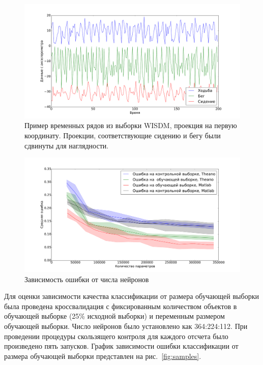 \documentclass[12pt]{article}
\begin{document}
\begin{figure}[tb!]
 \centering
  \includegraphics[width=1.0\textwidth]{wisdm.pdf}
 \caption{Пример временных рядов из выборки WISDM, проекция на первую координату. Проекции, соответствующие сидению и бегу были сдвинуты для наглядности.}
 \label{fig:wisdm}
\end{figure}


\begin{figure}[tb!]
 \centering
  \includegraphics[width=1.0\textwidth]{neurons.pdf}
 \caption{Зависимость ошибки от числа нейронов}
 \label{fig:neurons}
\end{figure}


Для оценки зависимости качества классификации от размера обучающей выборки была проведена кроссвалидация с фиксированным количеством объектов в обучающей выборке (25\% исходной выборки) и переменным размером обучающей выборки. Число нейронов было установлено как 364:224:112. При проведении процедуры скользящего контроля для каждого отсчета было произведено пять запусков. График зависимости ошибки классификации от размера обучающей выборки представлен на рис.~\ref{fig:samples}.
\end{document}
